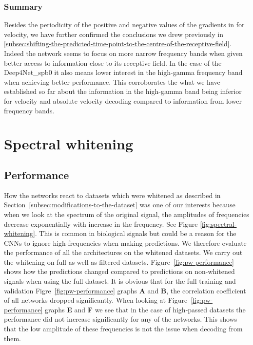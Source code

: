 \subsubsection{Summary}\label{subsubsec:across-shiftig-summary}
Besides the periodicity of the positive and negative values of the gradients in for velocity, we have further confirmed the conclusions we drew previously in \ref{subsec:shifting-the-predicted-time-point-to-the-centre-of-the-receptive-field}. 
Indeed the network seems to focus on more narrow frequency bands when given better access to information close to its receptive field.
In the case of the Deep4Net\_spb0 it also means lower interest in the high-gamma frequency band when achieving better performance.
This corroborates the what we have established so far about the information in the high-gamma band being inferior for velocity and absolute velocity decoding compared to information from lower frequency bands. 


\section{Spectral whitening}\label{sec:spectral-whitening}


\subsection{Performance}\label{subsec:pw-performance}
How the networks react to datasets which were whitened as described in Section~\ref{subsec:modifications-to-the-dataset} was one of our interests because when we look at the spectrum of the original signal, the amplitudes of frequencies decrease exponentially with increase in the frequency.
See Figure \ref{fig:spectral-whitening}.
This is common in biological signals but could be a reason for the CNNs to ignore high-frequencies when making predictions.
We therefore evaluate the performance of all the architectures on the whitened datasets. 
We carry out the whitening on full as well as filtered datasets. 
Figure~\ref{fig:pw-performance} shows how the predictions changed compared to predictions on non-whitened signals when using the full dataset.
It is obvious that for the full training and validation Figre~\ref{fig:pw-performance} graphs \textbf{A} and \textbf{B}, the correlation coefficient of all networks dropped significantly.
When looking at Figure~\ref{fig:pw-performance} graphs \textbf{E} and \textbf{F} we see that in the case of high-passed datasets the performance did not increase significantly for any of the networks. 
This shows that the low amplitude of these frequencies is not the issue when decoding from them. \\

